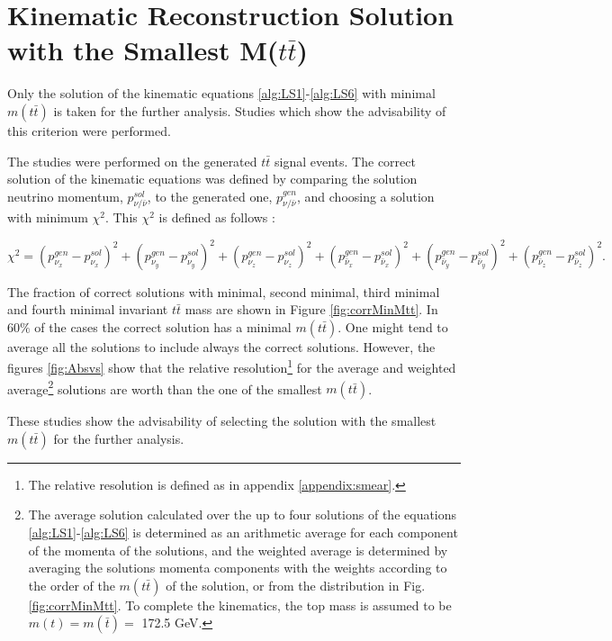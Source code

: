 \chapter{Kinematic Reconstruction Solution with the Smallest M($t\bar{t}$)}\label{appendix:mtt}

Only the solution of the kinematic equations \ref{alg:LS1}-\ref{alg:LS6} with minimal $m(t\bar{t})$ is taken for the further analysis.
Studies which show the advisability of this criterion were performed.

The studies were performed on the generated $t\bar{t}$ signal events. The correct solution of the kinematic equations was defined by comparing the 
solution neutrino momentum, $p_{\nu/\bar{\nu}}^{sol}$, to the generated one, $p_{\nu/\bar{\nu}}^{gen}$,  and choosing a solution with minimum $\chi^{2}$.
This $\chi^{2}$ is defined as follows \cite{Sonnenschein:2005ed}:

\begin{equation}
 \chi^{2} = (p_{\nu_{x}}^{gen} - p_{\nu_{x}}^{sol})^{2} + (p_{\nu_{y}}^{gen} - p_{\nu_{y}}^{sol})^{2} + (p_{\nu_{z}}^{gen} - p_{\nu_{z}}^{sol})^{2} + (p_{\bar{\nu}_{x}}^{gen} - p_{\bar{\nu}_{x}}^{sol})^{2} +
 (p_{\bar{\nu}_{y}}^{gen} - p_{\bar{\nu}_{y}}^{sol})^{2} + (p_{\bar{\nu}_{z}}^{gen} - p_{\bar{\nu}_{z}}^{sol})^{2}.
\end{equation}

The fraction of correct solutions with minimal, second minimal, third minimal and fourth minimal invariant $t\bar{t}$ mass are shown in Figure \ref{fig:corrMinMtt}. In $60\%$ of 
the cases the correct solution has a minimal $m(t\bar{t})$. One might tend to average all the solutions to include always the correct solutions. However, the figures \ref{fig:Absvs}
show that the relative resolution\footnote{The relative resolution is defined as in appendix \ref{appendix:smear}.} for the average and weighted average\footnote{The average 
solution calculated  over the up to four solutions of the equations  \ref{alg:LS1}-\ref{alg:LS6} is determined as an arithmetic average for each component of the momenta of the 
solutions, and the weighted average is determined by averaging the solutions momenta components with the weights according to the order of the $m(t\bar{t})$ of the solution, 
or from the distribution in Fig. \ref{fig:corrMinMtt}. To complete the kinematics, the top mass is assumed to be $m(t) = m(\bar{t}) = $ 172.5 GeV.} solutions are worth than the 
one of the smallest $m(t\bar{t})$.

These studies show the advisability of selecting the
solution with the smallest $m(t\bar{t})$ for the further analysis.


